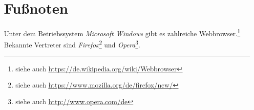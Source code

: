 \documentclass[12pt,a4paper]{scrartcl}
\begin{document}
%
\section{Fußnoten}
Unter dem Betriebssystem \textit{Microsoft Windows} gibt es zahlreiche
Webbrowser.\footnote{siehe auch \url{https://de.wikipedia.org/wiki/Webbrowser}}
Bekannte Vertreter sind \textit{Firefox}\footnote{siehe auch \url{https://www.mozilla.org/de/firefox/new/}} und \textit{Opera}\footnote{siehe auch \url{http://www.opera.com/de}}.
\end{document}
